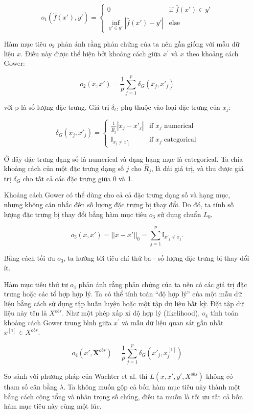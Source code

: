 $$o_1(\hat{f}(x'),y')=\begin{cases}0&\text{if $\hat{f}(x')\in{}y'$}\\\inf\limits_{y'\in y'}|\hat{f}(x')-y'|&\text{else}\end{cases}$$

Hàm mục tiêu $o_2$ phản ánh rằng phản chứng của ta nên gần giống với mẫu dữ liệu $x$. Điều này được thể hiện bởi khoảng cách giữa $x^\prime$ và $x$ theo khoảng cách Gower:

$$o_2(x,x')=\frac{1}{p}\sum_{j=1}^{p}\delta_G(x_j, x'_j)$$

với p là số lượng đặc trưng. Giá trị $\delta_G$ phụ thuộc vào loại đặc trưng của $x_j$:

$$\delta_G(x_j,x'_j)=\begin{cases}\frac{1}{\widehat{R}_j}|x_j-x'_j|&\text{if $x_j$ numerical}\\\mathbb{I}_{x_j\neq{}x'_j}&\text{if $x_j$ categorical}\end{cases}$$

Ở đây đặc trưng dạng số là numerical và dạng hạng mục là categorical. Ta chia khoảng cách của một đặc trưng dạng số $j$ cho $\widehat{R}_j$, là dải giá trị, và thu được giá trị $\delta_G$ cho tất cả các đặc trưng giữa 0 và 1.

Khoảng cách Gower có thể dùng cho cả cả đặc trưng dạng số và hạng mục, nhưng không cân nhắc đến số lượng đặc trưng bị thay đổi. Do đó, ta tính số lượng đặc trưng bị thay đổi bằng hàm mục tiêu $o_3$ sử dụng chuẩn $L_0$.

$$o_3(x,x')=||x-x'||_0=\sum_{j=1}^{p}\mathbb{I}_{x'_j\neq x_j}.$$

Bằng cách tối ưu $o_3$, ta hướng tới tiêu chí thứ ba - số lượng đặc trưng bị thay đổi ít.

Hàm mục tiêu thứ tư $o_4$ phản ánh rằng phản chứng của ta nên có các giá trị đặc trưng hoặc các tổ hợp hợp lý. Ta có thể tính toán ``độ hợp lý'' của một mẫu dữ liệu bằng cách sử dụng tập huấn luyện hoặc một tập dữ liệu bất kỳ. Đặt tập dữ liệu này tên là $X^{obs}$. Như một phép xấp xỉ độ hợp lý (likelihood), $o_4$ tính toán khoảng cách Gower trung bình giữa $x^\prime$ và mẫu dữ liệu quan sát gần nhất $x^{[1]}\in{}X^{obs}$.

$$o_4(x',\textbf{X}^{obs})=\frac{1}{p}\sum_{j=1}^{p}\delta_G(x'_j,x^{[1]}_j)$$

So sánh với phương pháp của Wachter et al. thì $L(x,x',y',X^{obs})$ không có tham số cân bằng $\lambda$. Ta không muốn gộp cả bốn hàm mục tiêu này thành một bằng cách cộng tổng và nhân trọng số chúng, điều ta muốn là tối ưu tất cả bốn hàm mục tiêu này cùng một lúc.

